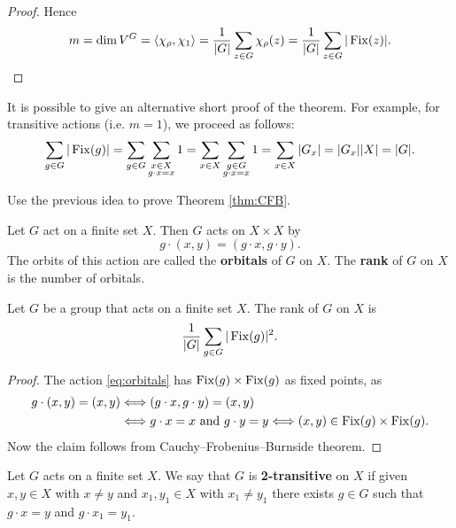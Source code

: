\begin{proof}
    Hence 
    \[
    m=\dim V^G=\langle\chi_\rho,\chi_1\rangle=\frac{1}{|G|}\sum_{z\in G}\chi_\rho(z)
    =\frac{1}{|G|}\sum_{z\in G}|\operatorname{Fix}(z)|.\qedhere 
    \]
\end{proof}

It is possible to give an alternative short proof of the theorem. For example, 
for transitive actions (i.e. $m=1$), we proceed as follows:
\[
\sum_{g\in G}|\operatorname{Fix}(g)|=\sum_{g\in G}\sum_{\substack{x\in X\\g\cdot x=x}}1
=\sum_{x\in X}\sum_{\substack{g\in G\\g\cdot x=x}}1
=\sum_{x\in X}|G_x|=|G_x||X|=|G|.
\]

\begin{exercise}
\label{xca:CFB}
    Use the previous idea to prove Theorem \ref{thm:CFB}. 
\end{exercise}

Let $G$ act on a finite set $X$. Then $G$ acts
on $X\times X$ by
\begin{equation}
    \label{eq:orbitals}
    g\cdot (x,y)=(g\cdot x,g\cdot y).
\end{equation}
The orbits of this action are called
the \textbf{orbitals} of $G$ on $X$. The \textbf{rank} 
of $G$ on $X$ is the number of orbitals. 

\begin{proposition}
    Let $G$ be a group that acts on a finite set $X$.
    The rank of $G$ on $X$ is 
    \[
    \frac{1}{|G|}\sum_{g\in G}|\operatorname{Fix}(g)|^2.
    \]
\end{proposition}

\begin{proof}
    The action \eqref{eq:orbitals} has 
    $\operatorname{Fix}(g)\times\operatorname{Fix}(g)$ as fixed points, as 
    \begin{align*}
        g\cdot (x,y)=(x,y)&\Longleftrightarrow
        (g\cdot x,g\cdot y)=(x,y)\\
        &\Longleftrightarrow g\cdot x=x\text{ and }g\cdot y=y\Longleftrightarrow
        (x,y)\in\operatorname{Fix}(g)\times\operatorname{Fix}(g).
    \end{align*}
    Now the claim follows from Cauchy--Frobenius--Burnside theorem. 
\end{proof}

\begin{definition}
    Let $G$ acts on a finite set $X$. 
    We say that $G$ is \textbf{2-transitive} on $X$ 
    if given $x,y\in X$ with $x\ne y$ and 
    $x_1,y_1\in X$ with $x_1\ne y_1$ there exists 
    $g\in G$ such that $g\cdot x=y$ and $g\cdot x_1=y_1$. 
\end{definition}

